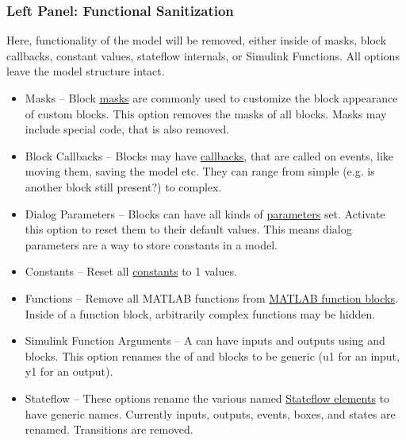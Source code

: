 \documentclass{article}
\begin{document}
\subsubsection{Left Panel: Functional Sanitization}
\label{lbl:leftside}
Here, functionality of the model will be removed, either inside of masks, block callbacks, constant values, stateflow internals, or Simulink Functions. All options leave the model structure intact.
\begin{itemize}
	\item Masks -- Block \href{https://www.mathworks.com/help/simulink/ug/block-masks.html}{masks} are commonly used to customize the block appearance of custom blocks. This option removes the masks of all blocks. Masks may include special code, that is also removed.
	\item Block Callbacks -- Blocks may have \href{https://www.mathworks.com/help/simulink/ug/block-callbacks.html}{callbacks}, that are called on events, like moving them, saving the model etc. They can range from simple (e.g. is another block still present?) to complex.
	\item Dialog Parameters -- Blocks can have all kinds of \href{https://www.mathworks.com/help/simulink/slref/block-specific-parameters.html}{parameters} set. Activate this option to reset them to their default values. This means dialog parameters are a way to store constants in a model.
	\item Constants -- Reset all \href{https://www.mathworks.com/help/simulink/slref/constant.html}{constants} to 1 values.
	\item Functions -- Remove all MATLAB functions from \href{https://www.mathworks.com/help/simulink/ug/what-is-a-matlab-function-block.html}{MATLAB function blocks}. Inside of a function block, arbitrarily complex functions may be hidden.
	\item Simulink Function Arguments -- A \simfunc can have inputs and outputs using \argin and \argout blocks. This option renames the  of \argin and \argout blocks to be generic (\eg u1 for an input, y1 for an output).
	
	\item Stateflow -- These options rename the various named \href{https://www.mathworks.com/help/stateflow/ug/overview-of-stateflow-objects.html}{Stateflow elements} to have generic names. Currently inputs, outputs, events, boxes, and states are renamed. Transitions are removed.
\end{itemize}
\end{document}
